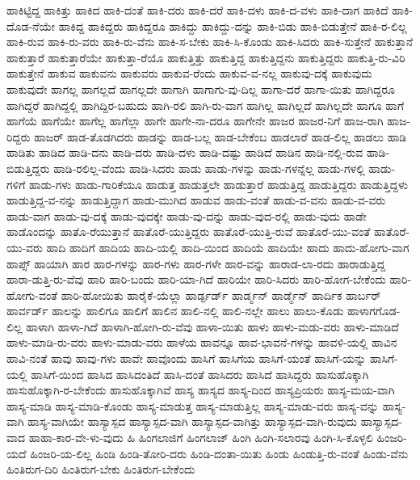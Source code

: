 {ಹಾಕಿಟ್ಟಿದ್ದ
ಹಾಕಿತ್ತು
ಹಾಕಿದ
ಹಾಕಿ-ದಂತೆ
ಹಾಕಿ-ದರು
ಹಾಕಿ-ದರೆ
ಹಾಕಿ-ದಳು
ಹಾಕಿ-ದ-ವಳು
ಹಾಕಿ-ದಾಗ
ಹಾಕಿದೆ
ಹಾಕಿ-ದೊಡ-ನೆಯೇ
ಹಾಕಿದ್ದ
ಹಾಕಿದ್ದರು
ಹಾಕಿದ್ದರೂ
ಹಾಕಿದ್ದು
ಹಾಕಿದ್ದು-ದನ್ನು
ಹಾಕಿ-ಬಿಡು
ಹಾಕಿ-ಬಿಡುತ್ತೇನೆ
ಹಾಕಿ-ರ-ಲಿಲ್ಲ
ಹಾಕಿ-ರುವ
ಹಾಕಿ-ರು-ವರು
ಹಾಕಿ-ರು-ವೆನು
ಹಾಕಿ-ಸ-ಬೇಕು
ಹಾಕಿ-ಸಿ-ಕೊಂಡು
ಹಾಕಿ-ಸಿದರು
ಹಾಕಿ-ಸುತ್ತೇನೆ
ಹಾಕುತ್ತಾನೆ
ಹಾಕುತ್ತಾರೆ
ಹಾಕುತ್ತಾರೆಯೇ
ಹಾಕುತ್ತಾ-ರೆಯೊ
ಹಾಕುತ್ತಿತ್ತು
ಹಾಕುತ್ತಿದ್ದ
ಹಾಕುತ್ತಿದ್ದನು
ಹಾಕುತ್ತಿದ್ದರು
ಹಾಕುತ್ತಿ-ರು-ವಿರಿ
ಹಾಕುತ್ತೇನೆ
ಹಾಕುವ
ಹಾಕುವನು
ಹಾಕುವರು
ಹಾಕುವ-ರೆಂದು
ಹಾಕುವ-ವ-ನಲ್ಲ
ಹಾಕುವು-ದಕ್ಕೆ
ಹಾಕುವುದು
ಹಾಕುವುದೇ
ಹಾಗಲ್ಲ
ಹಾಗಲ್ಲದೆ
ಹಾಗಲ್ಲದೇ
ಹಾಗಾಗಿ
ಹಾಗಾಗು-ವು-ದಿಲ್ಲ
ಹಾಗಾ-ದರೆ
ಹಾಗಾ-ಯಿತು
ಹಾಗಿದ್ದರೂ
ಹಾಗಿದ್ದರೆ
ಹಾಗಿದ್ದಲ್ಲಿ
ಹಾಗಿದ್ದಿರ-ಬಹುದು
ಹಾಗಿ-ರಲಿ
ಹಾಗಿ-ರು-ವಾಗ
ಹಾಗಿಲ್ಲ
ಹಾಗಿಲ್ಲದೆ
ಹಾಗಿಲ್ಲದೇ
ಹಾಗೂ
ಹಾಗೆ
ಹಾಗೆಯೆ
ಹಾಗೆಯೇ
ಹಾಗೆಲ್ಲ
ಹಾಗೆಲ್ಲಾ
ಹಾಗೇ
ಹಾಗೇ-ನಾ-ದರೂ
ಹಾಗೇನೇ
ಹಾಜರ
ಹಾಜರ-ನಿಗೆ
ಹಾಜ-ರಾಗಿ
ಹಾಜ-ರಿದ್ದರು
ಹಾಜರ್
ಹಾಡ-ತೊಡಗಿದರು
ಹಾಡನ್ನು
ಹಾಡ-ಬಲ್ಲ
ಹಾಡ-ಬೇಕೆಂಬ
ಹಾಡಲಾರೆ
ಹಾಡ-ಲಿಲ್ಲ
ಹಾಡಲು
ಹಾಡಿ
ಹಾಡಿತು
ಹಾಡಿದ
ಹಾಡಿ-ದನು
ಹಾಡಿ-ದರು
ಹಾಡಿ-ದಳು
ಹಾಡಿ-ದಷ್ಟು
ಹಾಡಿದೆ
ಹಾಡಿನ
ಹಾಡಿ-ನಲ್ಲಿ-ರುವ
ಹಾಡಿ-ಬಿಡುತ್ತಿದ್ದರು
ಹಾಡಿ-ರಲಿಲ್ಲ-ವೆಂದು
ಹಾಡಿ-ಸಿದರು
ಹಾಡು
ಹಾಡು-ಗಳನ್ನು
ಹಾಡು-ಗಳನ್ನೆಲ್ಲ
ಹಾಡು-ಗಳಲ್ಲಿ
ಹಾಡು-ಗಳಿಗೆ
ಹಾಡು-ಗಳು
ಹಾಡು-ಗಾರಿಕೆಯೂ
ಹಾಡುತ್ತ
ಹಾಡುತ್ತಲೇ
ಹಾಡುತ್ತಾರೆ
ಹಾಡುತ್ತಿದ್ದ
ಹಾಡುತ್ತಿದ್ದರು
ಹಾಡುತ್ತಿದ್ದಳು
ಹಾಡುತ್ತಿದ್ದ-ವ-ನನ್ನು
ಹಾಡುತ್ತಿದ್ದಾಗ
ಹಾಡು-ಮುಗಿದ
ಹಾಡುವ
ಹಾಡು-ವಂತೆ
ಹಾಡು-ವ-ವನು
ಹಾಡು-ವ-ವರು
ಹಾಡು-ವಾಗ
ಹಾಡು-ವು-ದಕ್ಕೆ
ಹಾಡು-ವುದಕ್ಕೇ
ಹಾಡು-ವು-ದನ್ನು
ಹಾಡು-ವುದ-ರಲ್ಲಿ
ಹಾಡು-ವುದು
ಹಾಡೇ
ಹಾಡೊಂದನ್ನು
ಹಾತೊ-ರೆಯುತ್ತಾನೆ
ಹಾತೊರೆ-ಯುತ್ತಿದ್ದರು
ಹಾತೊರೆ-ಯುತ್ತಿ-ರುವೆ
ಹಾತೊರೆ-ಯು-ವಂತೆ
ಹಾತೊರೆ-ಯು-ವರು
ಹಾದಿ
ಹಾದಿಗೆ
ಹಾದಿಯ
ಹಾದಿ-ಯಲ್ಲಿ
ಹಾದಿ-ಯಿಂದ
ಹಾದಿಯೆ
ಹಾದಿಯೇ
ಹಾದು
ಹಾದು-ಹೋಗು-ವಾಗ
ಹಾಪ್ಸ್
ಹಾಯಾಗಿ
ಹಾರ
ಹಾರ-ಗಳನ್ನು
ಹಾರ-ಗಳು
ಹಾರ-ಗಳೇ
ಹಾರ-ವನ್ನು
ಹಾರಾಡ-ಲಾ-ರದು
ಹಾರಾಡುತ್ತಿದ್ದ
ಹಾರಾ-ಡುತ್ತಿ-ರು-ವೆವು
ಹಾರಿ
ಹಾರಿ-ಬಂದು
ಹಾರಿ-ಯಾ-ಗಿದೆ
ಹಾರಿಯೇ
ಹಾರಿ-ಸಿದರು
ಹಾರಿ-ಹೋಗ-ಬೇಕೆಂದು
ಹಾರಿ-ಹೋಗು-ವಂತೆ
ಹಾರಿ-ಹೋಯಿತು
ಹಾರೈಕೆ-ಯೆಲ್ಲಾ
ಹಾರ್ಡ್ಫರ್ಡ್
ಹಾರ್ಡ್ಮನ್
ಹಾರ್ಡ್ಮೆನ್
ಹಾರ್ದಿಕ
ಹಾರ್ಬರ್
ಹಾರ್ವರ್ಡ್
ಹಾಲನ್ನು
ಹಾಲಿಗೂ
ಹಾಲಿಗೆ
ಹಾಲಿನ
ಹಾಲಿ-ನಲ್ಲಿ
ಹಾಲಿ-ನಲ್ಲೇ
ಹಾಲು
ಹಾಲು-ಕೊಡು
ಹಾಳಾಗಗೊಡ-ಲಿಲ್ಲ
ಹಾಳಾಗಿ
ಹಾಳಾ-ಗಿದೆ
ಹಾಳಾಗಿ-ಹೋಗಿ-ರು-ವೆವು
ಹಾಳಾ-ಯಿತು
ಹಾಳು
ಹಾಳು-ಮಡು-ವರು
ಹಾಳು-ಮಾಡಿದೆ
ಹಾಳು-ಮಾಡಿ-ರು-ವರು
ಹಾಳು-ಮಾಡು-ವರು
ಹಾಳೆಯ
ಹಾವನ್ನೂ
ಹಾವ-ಭಾವನೆ-ಗಳನ್ನು
ಹಾವಳಿ-ಯಲ್ಲಿ
ಹಾವಿನ
ಹಾವಿ-ನಂತೆ
ಹಾವು
ಹಾವು-ಗಳು
ಹಾವೇ
ಹಾವೊಂದು
ಹಾಸಿಗೆ
ಹಾಸಿಗೆಯ
ಹಾಸಿಗೆ-ಯಂತೆ
ಹಾಸಿಗೆ-ಯನ್ನು
ಹಾಸಿಗೆ-ಯಲ್ಲಿ
ಹಾಸಿಗೆ-ಯಿಂದ
ಹಾಸಿದ
ಹಾಸಿದಂತಿದೆ
ಹಾಸಿ-ದಂತೆ
ಹಾಸಿದರು
ಹಾಸಿದೆ
ಹಾಸಿದ್ದರು
ಹಾಸುಹೊಕ್ಕಾಗಿ
ಹಾಸುಹೊಕ್ಕಾಗಿ-ರ-ಬೇಕೆಂದು
ಹಾಸುಹೊಕ್ಕಾಗಿವೆ
ಹಾಸ್ಯ
ಹಾಸ್ಯದ
ಹಾಸ್ಯ-ದಿಂದ
ಹಾಸ್ಯಪ್ರಿಯರು
ಹಾಸ್ಯ-ಮಯ-ವಾಗಿ
ಹಾಸ್ಯ-ಮಾಡಿ
ಹಾಸ್ಯ-ಮಾಡಿ-ಕೊಂಡು
ಹಾಸ್ಯ-ಮಾಡುತ್ತ
ಹಾಸ್ಯ-ಮಾಡುತ್ತಿಲ್ಲ
ಹಾಸ್ಯ-ಮಾಡು-ವರು
ಹಾಸ್ಯ-ವನ್ನು
ಹಾಸ್ಯ-ವಾಗಿ
ಹಾಸ್ಯ-ವಾಗಿಯೇ
ಹಾಸ್ಯಾಸ್ಪದ
ಹಾಸ್ಯಾಸ್ಪದ-ವಾಗಿ
ಹಾಸ್ಯಾಸ್ಪದ-ವಾಗಿತ್ತು
ಹಾಸ್ಯಾಸ್ಪದ-ವಾಗಿ-ರುವುದು
ಹಾಸ್ಯಾಸ್ಪದ-ವಾದ
ಹಾಹಾ-ಕಾರ-ವೇ-ಳು-ವುದು
ಹಿ
ಹಿಂಗಲಾಜಿಗೆ
ಹಿಂಗಲಾಜ್
ಹಿಂಗಿ
ಹಿಂಗಿ-ಸಲಾರವು
ಹಿಂಗಿ-ಸಿ-ಕೊಳ್ಳಲಿ
ಹಿಂಜರಿ-ಯದೆ
ಹಿಂಜರಿ-ಯ-ಲಿಲ್ಲ
ಹಿಂಡಿ
ಹಿಂಡಿ-ತೋರಿ-ದರು
ಹಿಂಡಿ-ದಂತಾ-ಯಿತು
ಹಿಂಡು
ಹಿಂಡುತ್ತಿ-ರು-ವಂತೆ
ಹಿಂಡು-ವೆನು
ಹಿಂತಿರುಗ-ದಿರಿ
ಹಿಂತಿರುಗ-ಬೇಕು
ಹಿಂತಿರುಗ-ಬೇಕೆಂದು
}
